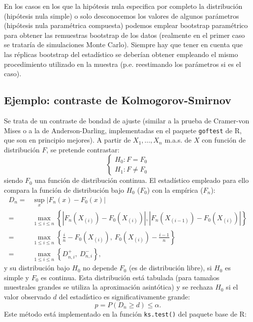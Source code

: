 \documentclass[
]{book}
\theoremstyle{break}
\theoremstyle{definition}
\theoremstyle{definition}
\theoremstyle{definition}
\theoremstyle{remark}
\begin{document}
En los casos en los que la hipótesis nula especifica por completo la distribución
(hipótesis nula simple) o solo desconocemos los valores de algunos parámetros
(hipótesis nula paramétrica compuesta) podemos emplear
bootstrap paramétrico para obtener las remuestras bootstrap de los datos
(realmente en el primer caso se trataría de simulaciones Monte Carlo).
Siempre hay que tener en cuenta que las réplicas bootstrap del estadístico se
deberían obtener empleando el mismo procedimiento utilizado en la muestra
(p.e. reestimando los parámetros si es el caso).

\hypertarget{ejemplo-contraste-de-kolmogorov-smirnov}{%
\subsection{Ejemplo: contraste de Kolmogorov-Smirnov}\label{ejemplo-contraste-de-kolmogorov-smirnov}}

Se trata de un contraste de bondad de ajuste (similar a la prueba de
Cramer-von Mises o a la de Anderson-Darling, implementadas en el paquete
\texttt{goftest} de R, que son en principio mejores).
A partir de \(X_1,\ldots ,X_n\) m.a.s. de \(X\) con función de distribución \(F\),
se pretende contrastar:
\[\left \{ 
\begin{array}{l}
H_0 : F = F_0 \\ 
H_1 : F \neq F_0 
\end{array}
\right. \]
siendo \(F_0\) una función de distribución continua.
El estadístico empleado para ello compara la función de distribución bajo
\(H_0\) (\(F_0\)) con la empírica (\(F_n\)):
\[\begin{aligned}
    D_n=&\sup_{x}|F_n(x)-F_0(x)| \\
    =&\max_{1 \leq i\leq n}\left \{
    |F_n(X_{(i)})-F_0(X_{(i)})|,|F_n(X_{(i-1)})-F_0(X_{(i)})|\right \} \\
    =&\max_{1 \leq i\leq n}\left \{ \frac{i}{n}-F_0(X_{(i)}), \ F_0(X_{(i)})-\frac{i-1}{n}\right \} \\
    =&\max_{1 \leq i\leq n}\left \{ D_{n,i}^{+},\ D_{n,i}^{-}\right \},
\end{aligned}\]
y su distribución bajo \(H_0\) no depende \(F_0\) (es de distribución libre),
si \(H_0\) es simple y \(F_0\) es continua.
Esta distribución está tabulada (para tamaños muestrales grandes se utiliza
la aproximación asintótica) y se rechaza \(H_0\) si el valor observado \(d\)
del estadístico es significativamente grande:
\[p = P \left( D_n \geq d \right) \leq \alpha.\]
Este método está implementado en la función \texttt{ks.test()} del paquete base de R:
\end{document}
